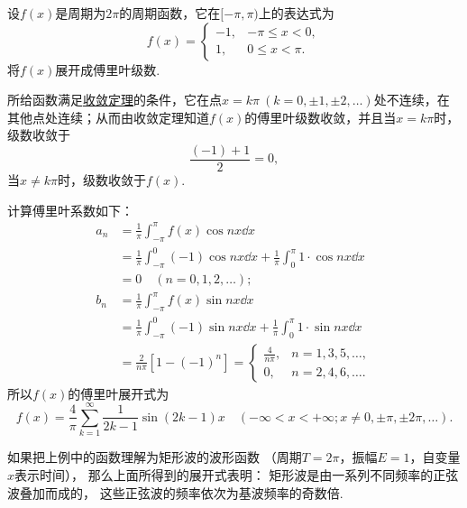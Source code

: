 \begin{example}[矩形波的谐波分析]
设\(f(x)\)是周期为\(2\pi\)的周期函数，它在\([-\pi,\pi)\)上的表达式为\[
f(x) = \left\{ \begin{array}{cc}
-1, & -\pi \leq x < 0, \\
1, & 0 \leq x < \pi.
\end{array} \right.
\]将\(f(x)\)展开成傅里叶级数.
\begin{solution}
所给函数满足\hyperref[theorem:无穷级数.傅里叶级数收敛的狄利克雷充分条件]{收敛定理}的条件，它在点\(x = k\pi\ (k=0,\pm1,\pm2,\dotsc)\)处不连续，在其他点处连续；从而由收敛定理知道\(f(x)\)的傅里叶级数收敛，并且当\(x = k\pi\)时，级数收敛于\[
\frac{(-1)+1}{2} = 0,
\]当\(x \neq k\pi\)时，级数收敛于\(f(x)\).

计算傅里叶系数如下：
\begin{align*}
	a_n &= \frac{1}{\pi} \int_{-\pi}^\pi f(x) \cos nx \dd{x} \\
		&= \frac{1}{\pi} \int_{-\pi}^0 (-1) \cos nx \dd{x}
			+ \frac{1}{\pi} \int_0^\pi 1 \cdot \cos nx \dd{x} \\
		&= 0 \quad(n=0,1,2,\dotsc); \\
	b_n &= \frac{1}{\pi} \int_{-\pi}^\pi f(x) \sin nx \dd{x} \\
		&= \frac{1}{\pi} \int_{-\pi}^0 (-1) \sin nx \dd{x}
			+ \frac{1}{\pi} \int_0^\pi 1 \cdot \sin nx \dd{x} \\
		&= \frac{2}{n\pi} [1-(-1)^n]
		= \left\{ \begin{array}{cl}
			\frac{4}{n\pi}, & n=1,3,5,\dotsc, \\
			0, & n=2,4,6,\dotsc.
		\end{array} \right.
\end{align*}
所以\(f(x)\)的傅里叶展开式为\[
	f(x) = \frac{4}{\pi} \sum\limits_{k=1}^\infty \frac{1}{2k-1} \sin(2k-1) x
	\quad(-\infty<x<+\infty;x\neq0,\pm\pi,\pm2\pi,\dotsc).
\]
\end{solution}
\end{example}
如果把上例中的函数理解为矩形波的波形函数%
（周期\(T=2\pi\)，振幅\(E=1\)，自变量\(x\)表示时间），
那么上面所得到的展开式表明：
矩形波是由一系列不同频率的正弦波叠加而成的，
这些正弦波的频率依次为基波频率的奇数倍.


